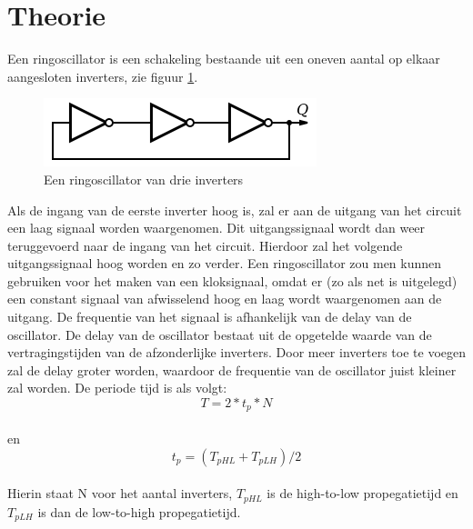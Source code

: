 \documentclass{scrartcl}  %
\begin{document}
\section{Theorie}
Een ringoscillator is een schakeling bestaande uit een oneven aantal op elkaar aangesloten inverters, zie figuur \ref{fig:ringoscillator drie inverters}.
\begin{figure}[H]
\centering
        \includegraphics[width=\linewidth]{images/ringoscilatortheorie.png}
        \caption{Een ringoscillator van drie inverters \cite{wikipedia}}
        \label{fig:ringoscillator drie inverters}
\end{figure}
Als de ingang van de eerste inverter hoog is, zal er aan de uitgang van het circuit een laag signaal worden waargenomen. Dit uitgangssignaal wordt dan weer teruggevoerd naar de ingang van het circuit. Hierdoor zal het volgende uitgangssignaal hoog worden en zo verder. Een ringoscillator zou men kunnen gebruiken voor het maken van een kloksignaal, omdat er (zo als net is uitgelegd) een constant signaal van afwisselend hoog en laag wordt waargenomen aan de uitgang. De frequentie van het signaal is afhankelijk van de delay van de oscillator. De delay van de oscillator bestaat uit de opgetelde waarde van de vertragingstijden van de afzonderlijke inverters. Door meer inverters toe te voegen zal de delay groter worden, waardoor de frequentie van de oscillator juist kleiner zal worden. De periode tijd is als volgt:
\begin{equation}
T= 2*t_{p}*N 
\end{equation}\cite[368]{rabaey-integrated-circuits}
\\en
\begin{equation}
t_{p}=(T_{pHL}+T_{pLH})/2 
\end{equation}\cite[28]{rabaey-integrated-circuits}
\\Hierin staat N voor het aantal inverters, $T_{pHL}$ is de high-to-low propegatietijd en $T_{pLH}$ is dan de low-to-high propegatietijd. 
\end{document}
